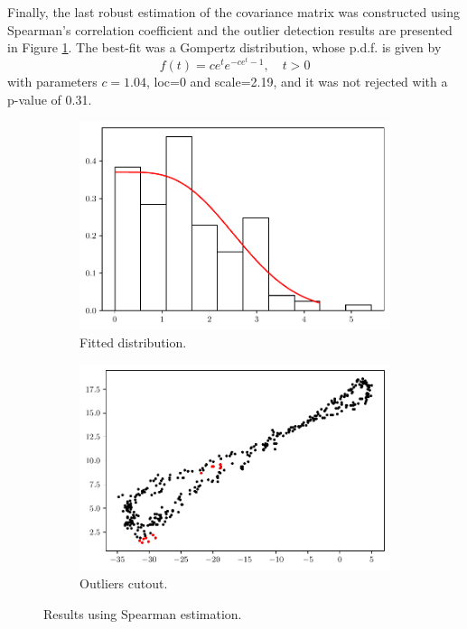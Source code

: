 \documentclass[11pt]{article}
\theoremstyle{definition}
\theoremstyle{remark}
\theoremstyle{remark}
\begin{document}
Finally, the last robust estimation of the covariance matrix was
constructed using Spearman's correlation coefficient and the outlier
detection results are presented in Figure
\ref{fig:spearman_cut_nnoise}. The best-fit was a Gompertz
distribution, whose p.d.f. is given by
\[
  f(t)=ce^{t}e^{-ce^{t}-1},\quad t>0
\]
with parameters $c=1.04$, loc=0 and scale=2.19, and it was not
rejected with a p-value of 0.31.

\begin{figure}[H]
  \centering
  \begin{subfigure}[t]{0.475\textwidth}
    \centering
    \includegraphics[scale=0.45]{../figs/spearman_hist_no-noise.pdf}
    \caption{Fitted distribution.}
    \end{subfigure}
  \begin{subfigure}[t]{0.475\textwidth}
    \centering
    \includegraphics[scale=0.45]{../figs/spearman_scatter_no-noise.pdf}
    \caption{Outliers cutout.}
    \end{subfigure}
  \caption{Results using Spearman estimation.}
  \label{fig:spearman_cut_nnoise}
\end{figure}
\end{document}
